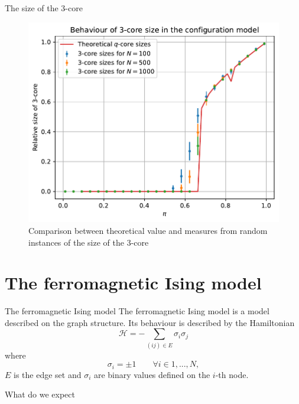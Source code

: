 \documentclass[handout]{beamer}
\begin{document}
\begin{frame}{The size of the 3-core}
    \begin{figure}
        \centering
        \includegraphics[height=.7\textheight]{qcore}
        \caption{Comparison between theoretical value and measures from random
        instances of the size of the 3-core}
        \label{fig:qcore}
    \end{figure}
\end{frame}

\section{The ferromagnetic Ising model}

\begin{frame}{The ferromagnetic Ising model}
    The \alert{ferromagnetic Ising model} is a model described on the graph
    structure. Its behaviour is described by the Hamiltonian
    \begin{equation}
        \mathcal{H} = -\sum_{(ij)\in E} \sigma_i \sigma_j
        \label{eq:ferroising_ham}
    \end{equation}
    where
    $$
        \sigma_i = \pm 1 \qquad \forall i \in 1, ..., N,
    $$
    $E$ is the edge set and $\sigma_i$ are binary values defined on the $i$-th
    node.
\end{frame}

\begin{frame}{What do we expect}
\end{frame}
\end{document}

